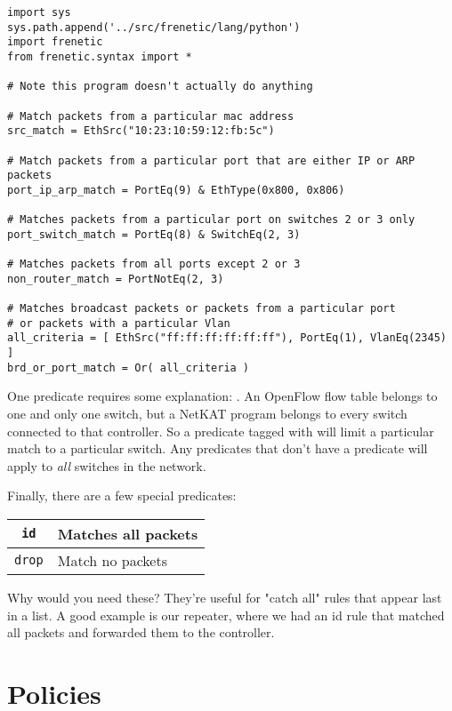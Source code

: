 \begin{verbatim}
import sys
sys.path.append('../src/frenetic/lang/python')
import frenetic
from frenetic.syntax import *

# Note this program doesn't actually do anything

# Match packets from a particular mac address
src_match = EthSrc("10:23:10:59:12:fb:5c")

# Match packets from a particular port that are either IP or ARP packets
port_ip_arp_match = PortEq(9) & EthType(0x800, 0x806)

# Matches packets from a particular port on switches 2 or 3 only
port_switch_match = PortEq(8) & SwitchEq(2, 3)

# Matches packets from all ports except 2 or 3
non_router_match = PortNotEq(2, 3)

# Matches broadcast packets or packets from a particular port 
# or packets with a particular Vlan
all_criteria = [ EthSrc("ff:ff:ff:ff:ff:ff"), PortEq(1), VlanEq(2345) ] 
brd_or_port_match = Or( all_criteria ) 

\end{verbatim}

One predicate requires some explanation: .  
An OpenFlow flow table belongs to one and only one switch, but a NetKAT program belongs to every
switch connected to that controller.  
So a predicate tagged with  will limit a particular match to a particular switch.
Any predicates that don't have a  predicate will apply to \textit{all} switches in the network.

Finally, there are a few special predicates:

\bigskip
\begin{tabularx}{6in}{|c|X|}
\hline\hline
\texttt{id} & Matches all packets
\\ \hline  
\texttt{drop} & Match no packets
\\ \hline\hline
\end{tabularx}
\bigskip

Why would you need these?  
They're useful for "catch all" rules that appear last in a list.
A good example is our repeater, where we had an id rule that matched all packets and
forwarded them to the controller.

\section{Policies}

